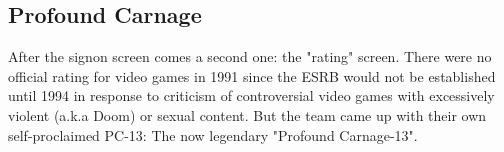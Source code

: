 \documentclass[book.tex]{subfiles}
\begin{document}
\subsection{Profound Carnage}
After the signon screen comes a second one: the "rating" screen. There were no official rating for video games in 1991 since the ESRB would not be established until 1994 in response to criticism of controversial video games with excessively violent (a.k.a Doom) or sexual content. But the team came up with their own self-proclaimed PC-13: The now legendary "Profound Carnage-13".\\
\begin{figure}[H]
\centering
{}
\end{figure}
\end{document}

